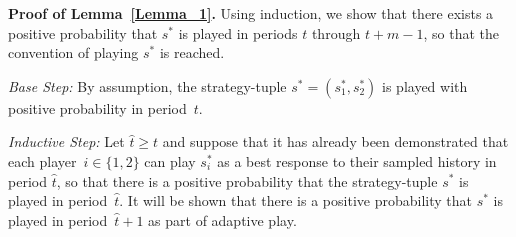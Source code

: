 \documentclass[11.5pt]{article}
\begin{document}
\textbf{Proof of Lemma~\ref{Lemma_1}.} 
%
%
%
Using induction, we show that there exists a positive probability that $s^*$ is played in periods $t$ through $t+m-1$, so that the convention of playing $s^*$ is reached.

\textit{Base Step:} By assumption, the strategy-tuple $s^* = (s^*_1, s^*_2)$ is played with positive probability in period~$t$.



\textit{Inductive Step:} Let $\hat{t}\geq t$ and suppose that it has already been demonstrated that each player~$i\in\{1,2\}$ can play $s^*_i$ as a best response to their sampled history in period $\hat{t}$, so that there is a positive probability that the strategy-tuple $s^*$ is played in period~$\hat{t}$. It will be shown that there is a positive probability that $s^*$ is played in period~$\hat{t}+1$ as part of adaptive play. 

\vskip6pt
\end{document}
